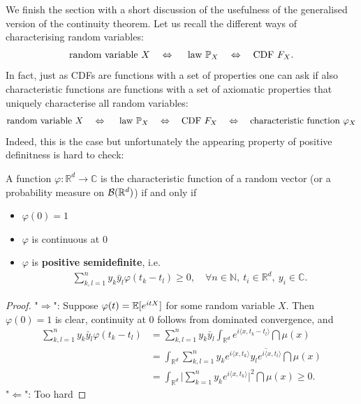 We finish the section with a short discussion of the usefulness of the generalised version of the continuity theorem. Let us recall the different ways of characterising random variables: 
\begin{align*}
	\text{random variable }X\quad \Leftrightarrow \quad \text{ law }\P_X\quad \Leftrightarrow \quad \text{CDF }F_X.
\end{align*}
In fact, just as CDFs are functions with a set of properties one can ask if also characteristic functions are functions with a set of axiomatic properties that uniquely characterise all random variables:
\begin{align*}
	\text{random variable }X\quad \Leftrightarrow \quad \text{ law }\P_X\quad \Leftrightarrow \quad \text{CDF }F_X\quad \Leftrightarrow\quad \text{characteristic function }\varphi_X
\end{align*}
Indeed, this is the case but unfortunately the appearing property of positive definitness is hard to check:
\begin{lsatz}
\begin{theorem}[Bochner]
	A function $\varphi \colon \mathbb{R}^d \to \mathbb{C}$ is the characteristic function of a random vector (or a probability measure on $\mathcal B(\R^d)$) if and only if 
	\begin{itemize}
		\item $\varphi(0)=1$
		\item $\varphi$ is continuous at $0$
		\item $\varphi$ is \textbf{positive semidefinite}, i.e. 
		\begin{align*}
			\sum_{k,l=1}^{n} y_k \bar{y}_l \varphi(t_k - t_l) \geq 0, \quad \forall n \in \mathbb{N}, \: t_i \in \mathbb{R}^d, \: y_i \in \mathbb{C}.
		\end{align*}	
	\end{itemize}
\end{theorem}
\end{lsatz}
\begin{proof}[Proof]
	"$\Rightarrow$": Suppose $\varphi(t)=\E[e^{itX}]$ for some random variable $X$. Then $\varphi(0) = 1$ is clear, continuity at $0$ follows from dominated convergence, and
		\begin{align*}
			\sum_{k,l=1}^n y_k \bar{y}_l \varphi (t_k - t_l) &= \sum_{k,l=1}^n y_k \bar{y}_l \int_{\mathbb{R}^d} e^{i \langle x, t_k - t_l \rangle} \dint \mu(x) \\
				&= \int_{\mathbb{R}^d} \sum_{k,l=1}^n y_k e^{i \langle x ,t_k \rangle} \overline{y_l e^{i \langle x ,t_l \rangle}} \dint \mu(x) \\
				&= \int_{\mathbb{R}^d} \Big\lvert \sum_{k=1}^n y_k e^{i \langle x , t_k \rangle} \Big\rvert^2 \dint \mu(x) \geq 0.
		\end{align*}
	"$\Leftarrow$": Too hard
\end{proof}
